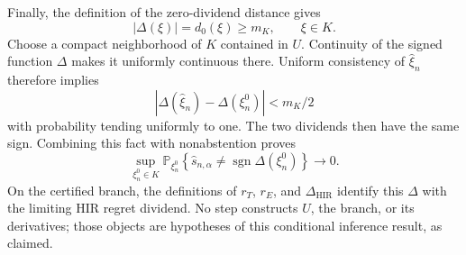 Finally, the definition of the zero-dividend distance gives
\[
 |\Delta(\xi)|=d_0(\xi)\ge m_K,
 \qquad \xi\in K.
\]
Choose a compact neighborhood of \(K\) contained in \(U\).  Continuity of the signed function \(\Delta\) makes it uniformly continuous there.  Uniform consistency of \(\widehat\xi_n\) therefore implies
\[
 |\Delta(\widehat\xi_n)-\Delta(\xi_n^0)|<m_K/2
\]
with probability tending uniformly to one.  The two dividends then have the same sign.  Combining this fact with nonabstention proves
\[
 \sup_{\xi_n^0\in K}\mathbb P_{\xi_n^0}\!\left\{
   \widehat s_{n,\alpha}\ne\operatorname{sgn}\Delta(\xi_n^0)
 \right\}\to0.
\]
On the certified branch, the definitions of \(r_T\), \(r_E\), and \(\Delta_{\mathrm{HIR}}\) identify this \(\Delta\) with the limiting HIR regret dividend.  No step constructs \(U\), the branch, or its derivatives; those objects are hypotheses of this conditional inference result, as claimed.

